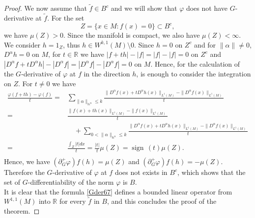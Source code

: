 \documentclass[10pt,a4paper]{amsart}
\DeclareMathOperator*{\sign}{sign\,}
\newcommand{\ar}{\mathbb{R}}
\begin{document}
\begin{proof}
We now assume that $\tilde{f}\in B^{c}$ and we will show that $\varphi$ does not have $G$-derivative at  $\tilde{f}$. For the set 
\begin{equation}\label{Zeq} Z=\{x\in M:f(x)=0\}\subset B^{c}, 
 \end{equation}
we have
$\mu(Z)>0.$ Since the manifold is compact, we also have $\mu(Z)<\infty$.  We consider $h=1_{Z}$, thus $h\in W^{k,1}(M)\setminus 0$. Since $h=0$ on $Z^c$ and for $\|\alpha\|\neq 0$, $D^{\alpha}h=0$ on $M$, for $t\in\ar$ we have  $|f+th|-|f|=|f|-|f|=0$ on  $Z^c$ and $|D^{\alpha}f+tD^{\alpha}h|-|D^{\alpha}f|=|D^{\alpha}f|-|D^{\alpha}f|=0$ on $M$. Hence, for the calculation of the $G$-derivative of $\varphi$ at $f$ in the direction $h$, is enough to consider the integration on $Z$.
 For $t\neq 0$ we have 
{\setlength\arraycolsep{0pt}
		\begin{align*}
		\frac{\varphi(f+th)-\varphi(f)}{t}=& \sum\limits_{\|\alpha\|_{\mathbb{N}^{n}}\leq k}\frac{  \|D^{\alpha}f(x)+tD^{\alpha}h(x)\|_{L^{1}(M)}-  \|D^{\alpha}f(x)\|_{L^{1}(M)}}{t} \\ 
		 =&\frac{  \|f(x)+th(x)\|_{L^{1}(M)}-  \|f(x)\|_{L^{1}(M)}}{t}\nonumber\\&\quad +\sum\limits_{0<\|\alpha\|_{\mathbb{N}^{n}}\leq k}\frac{  \|D^{\alpha}f(x)+tD^{\alpha}h(x)\|_{L^{1}(M)}-  \|D^{\alpha}f(x)\|_{L^{1}(M)}}{t}\nonumber\\ 
		 =&\frac{ \int_{Z}|t|dx}{t}=\frac{|t|}{t}\mu(Z)=\sign(t)\mu(Z).\nonumber\\
		\end{align*}}
Hence,  we have $(\partial_G^+\varphi)f(h)=\mu(Z)$ and $(\partial_G^+\varphi)f(h)=-\mu(Z)$. Therefore  the $G$-derivative of $\varphi$ at $f$ does not exists in $B^c$, which shows that the set of $G$-differentiability of the norm $\varphi$ is  $B$.\\
 
It is clear that the formula \eqref{Gder67} defines a bounded linear operator from  $ W^{1,1}(M)$ into $\ar$ for every $\tilde{f}$ in $B$, and this concludes the proof of the theorem.
\end{proof}
\end{document}
